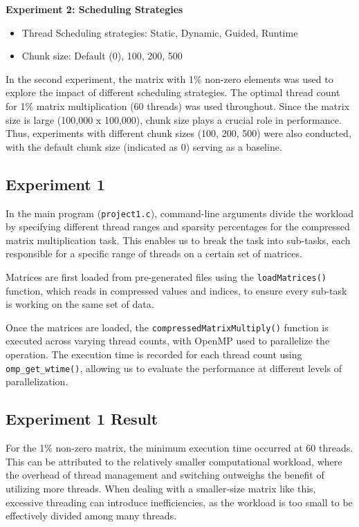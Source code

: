 \documentclass[
]{article}
\begin{document}
\textbf{Experiment 2: Scheduling Strategies}

\begin{itemize}
  \item Thread Scheduling strategies: Static, Dynamic, Guided, Runtime
  \item Chunk size: Default (0), 100, 200, 500
\end{itemize}

In the second experiment, the matrix with 1\% non-zero elements was used
to explore the impact of different scheduling strategies. The optimal
thread count for 1\% matrix multiplication (60 threads) was used
throughout. Since the matrix size is large (100,000 x 100,000), chunk
size plays a crucial role in performance. Thus, experiments with
different chunk sizes (100, 200, 500) were also conducted, with the
default chunk size (indicated as 0) serving as a baseline.

\subsection{Experiment 1}\label{experiment-1}

In the main program (\texttt{project1.c}), command-line arguments divide
the workload by specifying different thread ranges and sparsity
percentages for the compressed matrix multiplication task. This enables
us to break the task into sub-tasks, each responsible for a specific
range of threads on a certain set of matrices.

Matrices are first loaded from pre-generated files using the
\texttt{loadMatrices()} function, which reads in compressed values and
indices, to ensure every sub-task is working on the same set of data.

Once the matrices are loaded, the \texttt{compressedMatrixMultiply()}
function is executed across varying thread counts, with OpenMP used to
parallelize the operation. The execution time is recorded for each
thread count using \texttt{omp\_get\_wtime()}, allowing us to evaluate
the performance at different levels of parallelization.

\subsection{Experiment 1 Result}\label{experiment-1-result}

For the 1\% non-zero matrix, the minimum execution time occurred at 60
threads. This can be attributed to the relatively smaller computational
workload, where the overhead of thread management and switching
outweighs the benefit of utilizing more threads. When dealing with a
smaller-size matrix like this, excessive threading can introduce
inefficiencies, as the workload is too small to be effectively divided
among many threads.
\end{document}
